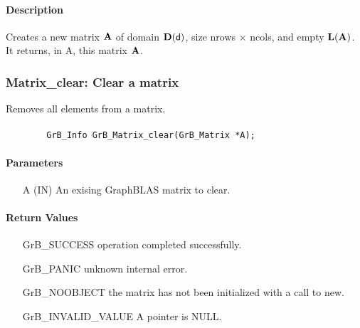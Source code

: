 \paragraph{Description}

Creates a new matrix ${\bf A}$ of domain $\bold{D}({\sf d})$, size {\sf nrows $\times$ ncols}, and
empty $\bold{L}({\bf A})$. It returns, in {\sf A}, this matrix ${\bf A}$.

\subsubsection{{\sf Matrix\_clear}: Clear a matrix}

Removes all elements from a matrix.

\paragraph{\syntax}

\begin{verbatim}
        GrB_Info GrB_Matrix_clear(GrB_Matrix *A);
\end{verbatim}

\paragraph{Parameters}

\begin{itemize}[leftmargin=1.1in]
    \item[{\sf A}] ({\sf IN}) An exising GraphBLAS matrix to clear.
\end{itemize}

\paragraph{Return Values}

\begin{itemize}[leftmargin=2.1in]
\item[{\sf GrB\_SUCCESS}]   operation completed successfully.
\item[{\sf GrB\_PANIC}]     unknown internal error.
\item[{\sf GrB\_NOOBJECT}]  the matrix has not been initialized with a call to new.
\item[{\sf GrB\_INVALID\_VALUE}]    {\sf A} pointer is {\sf NULL}.
\end{itemize}

